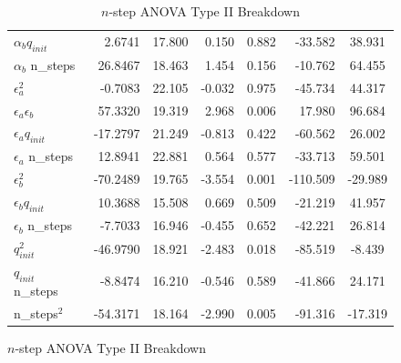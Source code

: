 \documentclass{article}
\begin{document}
\begin{table}[htbp]
\begin{subfigure}[b]{0.48\textwidth}
{\begin{tabular}{lrrrrrc}
            $\alpha_b q_{init}$ & 2.6741 & 17.800 & 0.150 & 0.882 & -33.582 & 38.931 \\
            $\alpha_b$ n\_steps & 26.8467 & 18.463 & 1.454 & 0.156 & -10.762 & 64.455 \\
            $\epsilon_a^2$ & -0.7083 & 22.105 & -0.032 & 0.975 & -45.734 & 44.317 \\
            $\epsilon_a\epsilon_b$ & 57.3320 & 19.319 & 2.968 & 0.006 & 17.980 & 96.684 \\
            $\epsilon_a q_{init}$ & -17.2797 & 21.249 & -0.813 & 0.422 & -60.562 & 26.002 \\
            $\epsilon_a$ n\_steps & 12.8941 & 22.881 & 0.564 & 0.577 & -33.713 & 59.501 \\
            $\epsilon_b^2$ & -70.2489 & 19.765 & -3.554 & 0.001 & -110.509 & -29.989 \\
            $\epsilon_b q_{init}$ & 10.3688 & 15.508 & 0.669 & 0.509 & -21.219 & 41.957 \\
            $\epsilon_b$ n\_steps & -7.7033 & 16.946 & -0.455 & 0.652 & -42.221 & 26.814 \\
            $q_{init}^2$ & -46.9790 & 18.921 & -2.483 & 0.018 & -85.519 & -8.439 \\
            $q_{init}$ n\_steps & -8.8474 & 16.210 & -0.546 & 0.589 & -41.866 & 24.171 \\
            n\_steps$^2$ & -54.3171 & 18.164 & -2.990 & 0.005 & -91.316 & -17.319 \\ \bottomrule
        \end{tabular}%
        }
    \end{subfigure}
    \hfill
    \begin{subfigure}[b]{0.48\textwidth}
        \centering
        \caption{$n$-step ANOVA Type II Breakdown}
        \label{tab:nstep_anova}
\end{subfigure}
\end{table}
\end{document}
